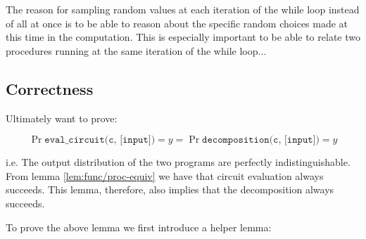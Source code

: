The reason for sampling random values at each iteration of the while loop instead of all at once is to be able to reason about the specific random choices made at this time in the computation. This is especially important to be able to relate two procedures running at the same iteration of the while loop...


\subsection{Correctness}
\label{sec:decomp_correct}
Ultimately want to prove:
\begin{lemma}
  \label{lem:decomposition_correctness}

  \[
    \Pr{\texttt{eval\_circuit(c, [input])} = y} =
    \Pr{\texttt{decomposition(c, [input])} = y}
  \]

  i.e. The output distribution of the two programs are perfectly indistinguishable. From lemma \ref{lem:func/proc-equiv} we have that circuit evaluation always succeeds. This lemma, therefore, also implies that the decomposition always succeeds.
\end{lemma}

To prove the above lemma we first introduce a helper lemma:

